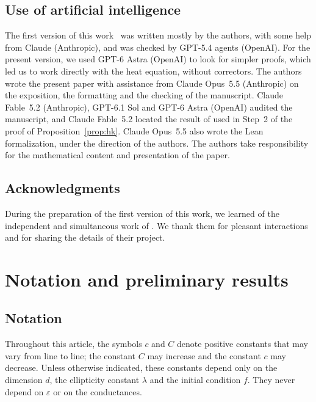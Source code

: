 \documentclass[11pt]{amsart}
\numberwithin{equation}{section}
\newcommand{\eps}{\varepsilon}
\begin{document}
\subsection*{Use of artificial intelligence}

The first version of this work~\citep{BD2026} was written mostly by the authors, with some help from Claude (Anthropic), and was checked by GPT-5.4 agents (OpenAI).
For the present version, we used GPT-6 Astra (OpenAI) to look for simpler proofs, which led us to work directly with the heat equation, without correctors.
The authors wrote the present paper with assistance from Claude Opus~5.5 (Anthropic) on the exposition, the formatting and the checking of the manuscript.
Claude Fable~5.2 (Anthropic), GPT-6.1 Sol and GPT-6 Astra (OpenAI) audited the manuscript, and Claude Fable~5.2 located the result of \citet{Malmquist2023} used in Step~2 of the proof of Proposition~\ref{prop:hk}.
Claude Opus~5.5 also wrote the Lean formalization, under the direction of the authors.
The authors take responsibility for the mathematical content and presentation of the paper.

\subsection*{Acknowledgments}

During the preparation of the first version of this work, we learned of the independent and simultaneous work of \citet*{CGW2026}.
We thank them for pleasant interactions and for sharing the details of their project.

\section{Notation and preliminary results} \label{sec:notation}


\subsection{Notation} \label{sec:not}

Throughout this article, the symbols $c$ and $C$ denote positive constants that may vary from line to line; the constant $C$ may increase and the constant $c$ may decrease.
Unless otherwise indicated, these constants depend only on the dimension $d$, the ellipticity constant $\lambda$ and the initial condition $f$.
They never depend on $\eps$ or on the conductances.
\end{document}
